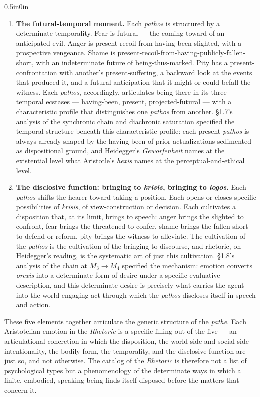 \begin{adjustwidth}{0.5in}{0in}
\begin{enumerate}
\item \textbf{The futural-temporal moment.} Each \textit{pathos} is structured by a determinate temporality. Fear is futural --- the coming-toward of an anticipated evil. Anger is present-recoil-from-having-been-slighted, with a prospective vengeance. Shame is present-recoil-from-having-publicly-fallen-short, with an indeterminate future of being-thus-marked. Pity has a present-confrontation with another's present-suffering, a backward look at the events that produced it, and a futural-anticipation that it might or could befall the witness. Each \textit{pathos}, accordingly, articulates being-there in its three temporal ecstases --- having-been, present, projected-futural --- with a characteristic profile that distinguishes one \textit{pathos} from another. \S1.7's analysis of the synchronic chain and diachronic saturation specified the temporal structure beneath this characteristic profile: each present \textit{pathos} is always already shaped by the having-been of prior actualizations sedimented as dispositional ground, and Heidegger's \textit{Geworfenheit} names at the existential level what Aristotle's \textit{hexis} names at the perceptual-and-ethical level.

\item \textbf{The disclosive function: bringing to \textit{krisis}, bringing to \textit{logos}.} Each \textit{pathos} shifts the hearer toward taking-a-position. Each opens or closes specific possibilities of \textit{krisis}, of view-construction or decision. Each cultivates a disposition that, at its limit, brings to speech: anger brings the slighted to confront, fear brings the threatened to confer, shame brings the fallen-short to defend or reform, pity brings the witness to alleviate. The cultivation of the \textit{pathos} is the cultivation of the bringing-to-discourse, and rhetoric, on Heidegger's reading, is the systematic art of just this cultivation. \S1.8's analysis of the chain at $M_3 \rightarrow M_4$ specified the mechanism: emotion converts \textit{orexis} into a determinate form of desire under a specific evaluative description, and this determinate desire is precisely what carries the agent into the world-engaging act through which the \textit{pathos} discloses itself in speech and action.
\end{enumerate}
\end{adjustwidth}

These five elements together articulate the generic structure of the \textit{pathē}. Each Aristotelian emotion in the \textit{Rhetoric} is a specific filling-out of the five --- an articulational concretion in which the disposition, the world-side and social-side intentionality, the bodily form, the temporality, and the disclosive function are just so, and not otherwise. The catalog of the \textit{Rhetoric} is therefore not a list of psychological types but a phenomenology of the determinate ways in which a finite, embodied, speaking being finds itself disposed before the matters that concern it.

